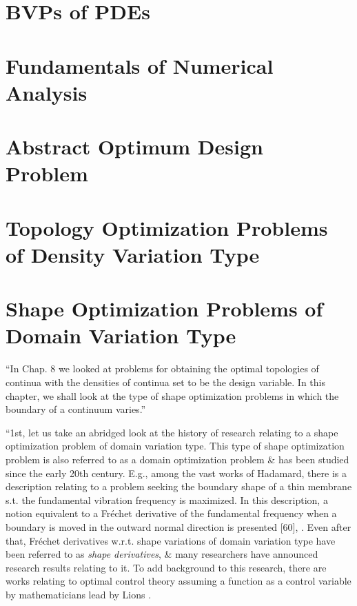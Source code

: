 \documentclass[oneside]{book}
\numberwithin{equation}{section}
\begin{document}
\section{BVPs of PDEs}


\section{Fundamentals of Numerical Analysis}


\section{Abstract Optimum Design Problem}


\section{Topology Optimization Problems of Density Variation Type}


\section{Shape Optimization Problems of Domain Variation Type}
``In Chap. 8 we looked at problems for obtaining the optimal topologies of continua with the densities of continua set to be the design variable. In this chapter, we shall look at the type of shape optimization problems in which the boundary of a continuum varies.''

``1st, let us take an abridged look at the history of research relating to a shape optimization problem of domain variation type. This type of shape optimization problem is also referred to as a domain optimization problem \& has been studied since the early 20th century. E.g., among the vast works of Hadamard, there is a description relating to a problem seeking the boundary shape of a thin membrane s.t. the fundamental vibration frequency is maximized. In this description, a notion equivalent to a Fr\'echet derivative of the fundamental frequency when a boundary is moved in the outward normal direction is presented [60], \cite{Sokolowski_Zolesio1992}. Even after that, Fr\'echet derivatives w.r.t. shape variations of domain variation type have been referred to as \textit{shape derivatives}, \& many researchers have announced research results relating to it. To add background to this research, there are works relating to optimal control theory assuming a function as a control variable by mathematicians lead by Lions \cite{Lions1971}.
\end{document}
